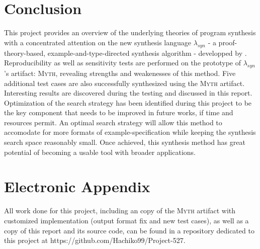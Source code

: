 \documentclass[preprint, 11pt]{sigplanconf}
\begin{document}
\section{Conclusion}\label{sec-conl}
This project provides an overview of the underlying theories of program synthesis with a concentrated attention on the new synthesis language $\lambda_{syn}$ - a proof-theory-based, example-and-type-directed synthesis algorithm - developped by \citet{osera2015type}. Reproducibility as well as sensitivity tests are performed on the prototype of $\lambda_{syn}$'s artifact: \textsc{Myth}, revealing strengths and weakenesses of this method. Five additional test cases are also successfully synthesized using the \textsc{Myth} artifact. Interesting results are discovered during the testing and discussed in this report. Optimization of the search strategy has been identified during this project to be the key component that needs to be improved in future works, if time and resources permit. An optimal search strategy will allow this method to accomodate for more formats of example-specification while keeping the synthesis search space reasonably small. Once achieved, this synthesis method has great potential of becoming a usable tool with broader applications.\\


\appendix
\section{Electronic Appendix}
All work done for this project, including an copy of the \textsc{Myth} artifact with customized implementation (output format fix and new test cases), as well as a copy of this report and its source code, can be found in a repository dedicated to this project at https://github.com/Hachiko99/Project-527.
\end{document}
